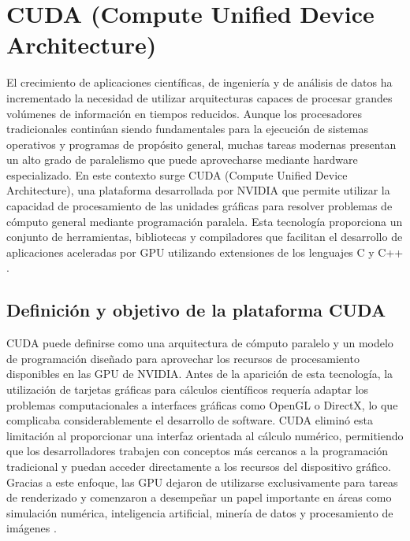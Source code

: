 \section{CUDA (Compute Unified Device Architecture)}

El crecimiento de aplicaciones científicas, de ingeniería y de análisis de datos ha incrementado la necesidad de utilizar arquitecturas capaces de procesar grandes volúmenes de información en tiempos reducidos. Aunque los procesadores tradicionales continúan siendo fundamentales para la ejecución de sistemas operativos y programas de propósito general, muchas tareas modernas presentan un alto grado de paralelismo que puede aprovecharse mediante hardware especializado. En este contexto surge CUDA (Compute Unified Device Architecture), una plataforma desarrollada por NVIDIA que permite utilizar la capacidad de procesamiento de las unidades gráficas para resolver problemas de cómputo general mediante programación paralela. Esta tecnología proporciona un conjunto de herramientas, bibliotecas y compiladores que facilitan el desarrollo de aplicaciones aceleradas por GPU utilizando extensiones de los lenguajes C y C++ \cite{nvidiaCUDA,nvidiaToolkit}.

\subsection{Definición y objetivo de la plataforma CUDA}

CUDA puede definirse como una arquitectura de cómputo paralelo y un modelo de programación diseñado para aprovechar los recursos de procesamiento disponibles en las GPU de NVIDIA. Antes de la aparición de esta tecnología, la utilización de tarjetas gráficas para cálculos científicos requería adaptar los problemas computacionales a interfaces gráficas como OpenGL o DirectX, lo que complicaba considerablemente el desarrollo de software. CUDA eliminó esta limitación al proporcionar una interfaz orientada al cálculo numérico, permitiendo que los desarrolladores trabajen con conceptos más cercanos a la programación tradicional y puedan acceder directamente a los recursos del dispositivo gráfico. Gracias a este enfoque, las GPU dejaron de utilizarse exclusivamente para tareas de renderizado y comenzaron a desempeñar un papel importante en áreas como simulación numérica, inteligencia artificial, minería de datos y procesamiento de imágenes \cite{nvidiaCUDA,investigacionCUDA}.

